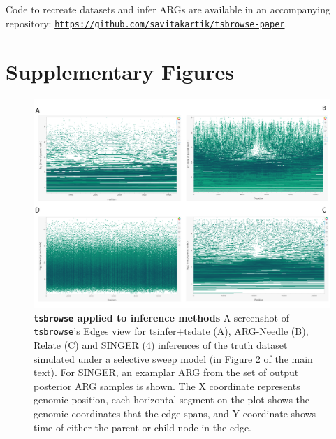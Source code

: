 \documentclass[unnumsec,webpdf,contemporary,large,namedate]{oup-authoring-template}%
\begin{document}
\subsection{} Code to recreate datasets and infer ARGs are available in an
accompanying repository:
\texttt{\url{https://github.com/savitakartik/tsbrowse-paper}}.

\clearpage
\section{Supplementary Figures}
\begin{figure}
    \centering
    \includegraphics[width=0.95\linewidth]{figures/SuppFig1.png}
    \caption{\textbf{\texttt{tsbrowse} applied to inference methods}
    A screenshot of \texttt{tsbrowse}'s Edges view for tsinfer+tsdate (A),
ARG-Needle (B), Relate (C) and SINGER (4) inferences of the truth dataset
simulated under a selective sweep model (in Figure 2 of the main text). For
SINGER, an examplar ARG from the set of output posterior ARG samples is shown.
The X coordinate represents genomic position, each horizontal segment on the
plot shows the genomic coordinates that the edge spans, and Y coordinate shows
time of either the parent or child node in the edge.}
    \label{fig:Supplementary_Figure_1}
\end{figure}
\end{document}
